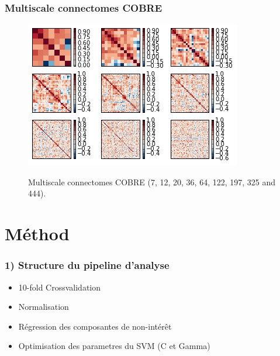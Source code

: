 \documentclass{beamer}
\begin{document}
\begin{frame}
\frametitle{Multiscale connectomes COBRE}
\begin{figure}
\begin{center}
\includegraphics[scale=0.9]{../figures/connectome3x3.png}
\end{center}
\tiny{Multiscale connectomes COBRE (7, 12, 20, 36, 64, 122, 197, 325 and 444).}
\label{fig_multiscale_cobre}
\end{figure}
\end{frame}

\section{Méthod}
\frame{\sectionpage}

\begin{frame}
\frametitle{1) Structure du pipeline d'analyse}
\hfill\break
\begin{itemize}
\item 10-fold Crossvalidation
\item Normalisation
\item Régression des composantes de non-intérêt
\item Optimisation des parametres du SVM (C et Gamma)
\end{itemize}
\end{frame}
\end{document}
